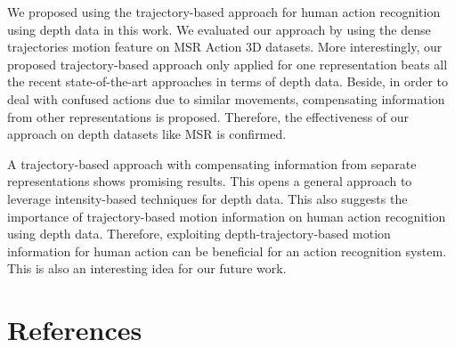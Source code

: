 \documentclass[review]{elsarticle}
\begin{document}
We proposed using the trajectory-based approach for human action recognition using depth data in this work. We evaluated our approach by using the dense trajectories motion feature on MSR Action 3D datasets. More interestingly, our proposed trajectory-based approach only applied for one representation beats all the recent state-of-the-art approaches in terms of depth data. Beside, in order to deal with confused actions due to similar movements, compensating information from other representations is proposed. Therefore, the effectiveness of our approach on depth datasets like MSR is confirmed.

A trajectory-based approach with compensating information from separate representations shows promising results. This opens a general approach to leverage intensity-based techniques for depth data. This also suggests the importance of trajectory-based motion information on human action recognition using depth data. Therefore, exploiting depth-trajectory-based motion information for human action can be beneficial for an action recognition system. This is also an interesting idea for our future work.

\section*{References}



\end{document}
